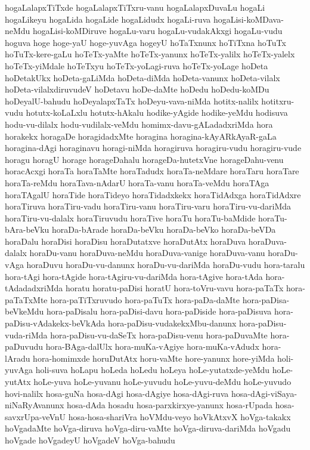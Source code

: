 {hogaLalapxTiTxde
hogaLalapxTiTxru-vanu
hogaLalapxDuvaLu
hogaLi
hogaLikeyu
hogaLida
hogaLide
hogaLidudx
hogaLi-ruva
hogaLisi-koMDava-neMdu
hogaLisi-koMDiruve
hogaLu-varu
hogaLu-vudakAkxgi
hogaLu-vudu
hoguva
hoge
hoge-yaU
hoge-yuvAga
hogeyU
hoTaTxnunx
hoTiTxna
hoTuTx
hoTuTx-kere-gaLu
hoTeTx-yaMte
hoTeTx-yanunx
hoTeTx-yalilx
hoTeTx-yalelx
hoTeTx-yiMdale
hoTeTxyu
hoTeTx-yoLagi-ruva
hoTeTx-yoLage
hoDeta
hoDetakUkx
hoDeta-gaLiMda
hoDeta-diMda
hoDeta-vanunx
hoDeta-vilalx
hoDeta-vilalxdiruvudeV
hoDetavu
hoDe-daMte
hoDedu
hoDedu-koMDu
hoDeyalU-bahudu
hoDeyalapxTaTx
hoDeyu-vava-niMda
hotitx-nalilx
hotitxru-vudu
hotutx-koLaLxlu
hotutx-hAkalu
hodike-yAgide
hodike-yeMdu
hodisuva
hodu-vu-dilalx
hodu-vudilalx-veMdu
homimx-davu-gALadadxriMda
hora
horakekx
horagaDe
horagidadxMte
horagina
horagina-kAyARkAyaR-gaLa
horagina-dAgi
horaginavu
horagi-niMda
horagiruva
horagiru-vudu
horagiru-vude
horagu
horagU
horage
horageDahalu
horageDa-hutetxVne
horageDahu-venu
horacAcxgi
horaTa
horaTaMte
horaTadudx
horaTa-neMdare
horaTaru
horaTare
horaTa-reMdu
horaTava-nAdarU
horaTa-vanu
horaTa-veMdu
horaTAga
horaTAgalU
horaTide
horaTideyo
horaTidadxkekx
horaTidAdxga
horaTidAdxre
horaTiruva
horaTiru-vadu
horaTiru-vanu
horaTiru-varu
horaTiru-vu-dariMda
horaTiru-vu-dalalx
horaTiruvudu
horaTive
horaTu
horaTu-baMdide
horaTu-bAra-beVku
horaDa-bArade
horaDa-beVku
horaDa-beVko
horaDa-beVDa
horaDalu
horaDisi
horaDisu
horaDutatxve
horaDutAtx
horaDuva
horaDuva-dalalx
horaDu-vanu
horaDuva-neMdu
horaDuva-vanige
horaDuva-vanu
horaDu-vAga
horaDuvu
horaDu-vu-danunx
horaDu-vu-dariMda
horaDu-vudu
hora-taralu
hora-tAgi
hora-tAgide
hora-tAgiru-vu-dariMda
hora-tAgive
hora-tAda
hora-tAdadadxriMda
horatu
horatu-paDisi
horatU
hora-toVru-vavu
hora-paTaTx
hora-paTaTxMte
hora-paTiTxruvudo
hora-paTuTx
hora-paDa-daMte
hora-paDisa-beVkeMdu
hora-paDisalu
hora-paDisi-davu
hora-paDiside
hora-paDisuva
hora-paDisu-vAdakekx-beVkAda
hora-paDisu-vudakekxMbu-danunx
hora-paDisu-vuda-riMda
hora-paDisu-vu-daSeTx
hora-paDisu-venu
hora-paDuvaMte
hora-paDuvudu
hora-BAga-dalUlx
hora-muKa-vAgiye
hora-muKa-vAdudx
hora-lAradu
hora-homimxde
horuDutAtx
horu-vaMte
hore-yanunx
hore-yiMda
holi-yuvAga
holi-suva
hoLapu
hoLeda
hoLedu
hoLeya
hoLe-yutatxde-yeMdu
hoLe-yutAtx
hoLe-yuva
hoLe-yuvanu
hoLe-yuvudu
hoLe-yuvu-deMdu
hoLe-yuvudo
hovi-nalilx
hosa-guNa
hosa-dAgi
hosa-dAgiye
hosa-dAgi-ruva
hosa-dAgi-viSaya-niNaRyAvanunx
hosa-dAda
hosadu
hosa-parxkirxye-yanunx
hosa-rUpada
hosa-savxrUpa-veVnU
hosa-hosa-shariVra
hoVMdu-veyo
hoVkAtxvX
hoVga-takakx
hoVgadaMte
hoVga-diruva
hoVga-diru-vaMte
hoVga-diruva-dariMda
hoVgadu
hoVgade
hoVgadeyU
hoVgadeV
hoVga-bahudu
}
